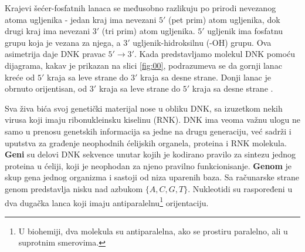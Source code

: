 \documentclass[12pt,oneside]{memoir}
\begin{document}
\begin{comment}
 Šećeri u DNK su međusobno povezani fosfatnim grupama koje stvaraju fosfodiestarsku vezu između trećeg i petog ugljenikovog atoma šećernog prstena. Fosfodiestarske veze su asimetrične, te DNK polinukleotidni lanci imaju smer. Kako ovi lanci idu u suprotnim smerovima, kaže se da je DNK antiparalelna. Asimetrični krajevi DNK baza se označavaju sa 5' (pet prim) i 3' (tri prim). Antiparalelnost znači da jedan lanac ide u smeru 5' \rightarrow 3', dok suprotni lanac ide u smeru 3' \rightarrow 5'. 

$5'$ i $3'$ označavaju brojeve ugljenika koji se nalaze u osnovi DNK šećera. $5'$ ugljenik ima fosfatnu grupu koja je vezana za njega, a $3'$ ugljenik-hidroksilnu (-OH) grupu. Ova asimetrija daje DNK pravac koji se obeležava sa $5' \rightarrow 3'$. Na primer, DNK polimeraza deluje u pravcu $5' \rightarrow 3'$, tj. dodaje nukleotide na $3'$ kraj molekula napredujući u tom smeru.

\end{comment}

Krajevi šećer-fosfatnih lanaca se međusobno razlikuju po prirodi nevezanog atoma ugljenika - jedan kraj ima nevezani $5'$ (pet prim) atom ugljenika, dok drugi kraj ima nevezani $3'$ (tri prim) atom ugljenika. $5'$ ugljenik ima fosfatnu grupu koja je vezana za njega, a $3'$ ugljenik-hidroksilnu (-OH) grupu. Ova asimetrija daje DNK pravac $5' \rightarrow 3'$. Kada predstavljamo molekul DNK pomoću dijagrama, kakav je prikazan na slici \ref{fig:00}, podrazumeva se da gornji lanac kreće od $5'$ kraja sa leve strane do $3'$ kraja sa desne strane. Donji lanac je obrnuto orijentisan, od $3'$ kraja sa leve strane do $5'$ kraja sa desne strane \cite{DNA2}. 

Sva živa bića svoj genetički materijal nose u obliku DNK, sa izuzetkom nekih virusa koji imaju ribonukleinsku kiselinu (RNK). DNK ima veoma važnu ulogu ne samo u prenosu genetskih informacija sa jedne na drugu generaciju, već sadrži i uputstva za građenje neophodnih ćelijskih organela, proteina i RNK molekula. \textbf{Geni} su delovi DNK sekvence unutar kojih je kodirano pravilo za sintezu jednog proteina u ćeliji, koji je neophodan za njeno pravilno funkcionisanje. \textbf{Genom} je skup gena jednog organizma i sastoji od niza uparenih baza. Sa računarske strane genom predstavlja nisku nad azbukom $\{A, C, G, T\}$. Nukleotidi su raspoređeni u dva dugačka lanca koji imaju antiparalelnu\footnote{U biohemiji, dva molekula su antiparalelna, ako se prostiru paralelno, ali u suprotnim smerovima.} orijentaciju.
\end{document}
